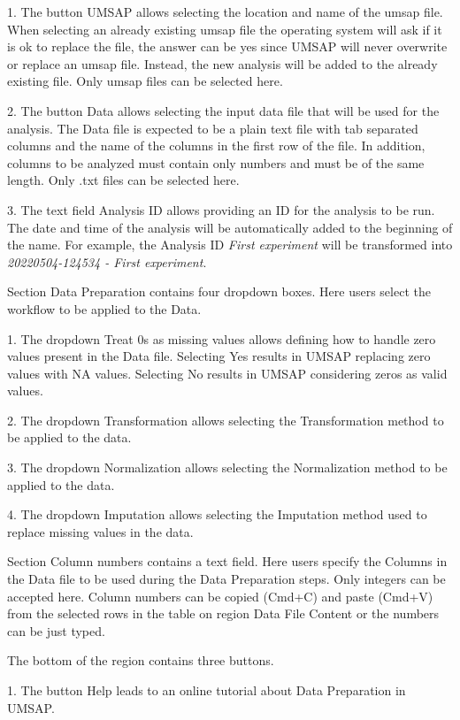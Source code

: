 \num{1}. The button UMSAP allows selecting the location
and name of the umsap file. When selecting an already existing umsap file the operating
system will ask if it is ok to replace the file, the answer can be yes since UMSAP
will never overwrite or replace an umsap file. Instead, the new analysis will be
added to the already existing file. Only umsap files can be selected here.

\num{2}. The button Data allows selecting the input
data file that will be used for the analysis. The Data file is expected to be a
plain text file with tab separated columns and the name of the columns in the first
row of the file. In addition, columns to be analyzed must contain only numbers and
must be of the same length. Only .txt files can be selected here.

\num{3}. The text field Analysis ID allows providing an ID for the analysis
to be run. The date and time of the analysis will be automatically added to the
beginning of the name. For example, the Analysis ID \textit{First experiment} will
be transformed into \textit{20220504-124534 - First experiment}.

Section Data Preparation contains four dropdown boxes. Here users select the workflow
to be applied to the Data.

\num{1}. The dropdown Treat \num{0}s as missing values allows defining how
to handle zero values present in the Data file. Selecting Yes results in UMSAP
replacing zero values with NA values. Selecting No results in UMSAP considering
zeros as valid values.

\num{2}. The dropdown Transformation allows selecting the Transformation method
to be applied to the data.

\num{3}. The dropdown Normalization allows selecting the Normalization method
to be applied to the data.

\num{4}. The dropdown Imputation allows selecting the Imputation method used
to replace missing values in the data.

Section Column numbers contains a text field. Here users specify the Columns in the
Data file to be used during the Data Preparation steps. Only integers can be accepted
here. Column numbers can be copied (Cmd+C) and paste (Cmd+V) from the selected rows
in the table on region Data File Content or the numbers can be just typed.

The bottom of the region contains three buttons.

\num{1}. The button Help leads to an online tutorial about Data Preparation in
UMSAP.

